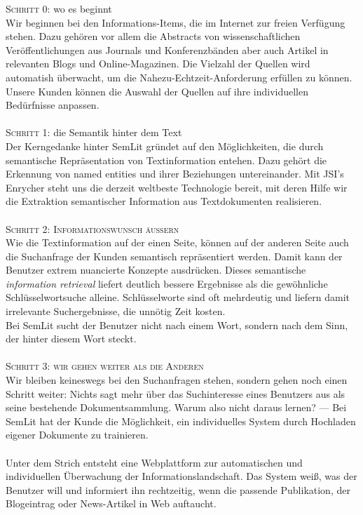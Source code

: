 \textsc{Schritt 0:} wo es beginnt\\
Wir beginnen bei den Informations-Items, die im Internet zur freien Verfügung stehen. Dazu gehören vor allem die Abstracts von wissenschaftlichen Veröffentlichungen aus Journals und Konferenzbänden aber auch Artikel in relevanten Blogs und Online-Magazinen. Die Vielzahl der Quellen wird automatish überwacht, um die Nahezu-Echtzeit-Anforderung erfüllen zu können.\\
{\color{orange}Unsere Kunden können die Auswahl der Quellen auf ihre individuellen Bedürfnisse anpassen. }
\\
\\
\textsc{Schritt 1:} die Semantik hinter dem Text\\
Der Kerngedanke hinter SemLit gründet auf den Möglichkeiten, die durch semantische Repräsentation von Textinformation entehen. Dazu gehört die Erkennung von named entities und ihrer Beziehungen untereinander. Mit JSI's Enrycher steht uns die derzeit weltbeste Technologie bereit, mit deren Hilfe wir die Extraktion semantischer Information aus Textdokumenten realisieren. 
\\
\\
\textsc{Schritt 2: Informationswunsch äußern}\\
Wie die Textinformation auf der einen Seite, können auf der anderen Seite auch die Suchanfrage der Kunden semantisch repräsentiert werden. Damit kann der Benutzer extrem nuancierte Konzepte ausdrücken. 
Dieses semantische \emph{information retrieval} liefert deutlich bessere Ergebnisse als die gewöhnliche Schlüsselwortsuche alleine. Schlüsselworte sind oft mehrdeutig und liefern damit irrelevante Suchergebnisse, die unnötig Zeit kosten. \\
{\color{orange}Bei SemLit sucht der Benutzer nicht nach einem Wort, sondern nach dem Sinn, der hinter diesem Wort steckt.}
\\
\\
\textsc{Schritt 3: wir gehen weiter als die Anderen}\\
Wir bleiben keineswegs bei den Suchanfragen stehen, sondern gehen noch einen Schritt weiter: Nichts sagt mehr über das Suchinteresse eines Benutzers aus als seine bestehende Dokumentsammlung. Warum also nicht daraus lernen? --- Bei SemLit hat der Kunde die Möglichkeit, ein individuelles System durch Hochladen eigener Dokumente zu trainieren.
\\
\\
{\color{orange}Unter dem Strich entsteht eine Webplattform zur automatischen und individuellen Überwachung der Informationslandschaft. Das System weiß, was der Benutzer will und informiert ihn rechtzeitig, wenn die passende Publikation, der Blogeintrag oder News-Artikel in Web auftaucht.}


